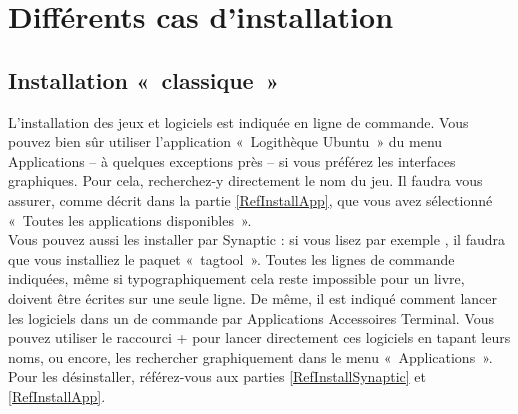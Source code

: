 \section{Différents cas d'installation}
\label{RefInstallJeuEtLogiciel}
\subsection{Installation «~classique~»}
L'installation des jeux et logiciels est indiquée en ligne de commande. Vous pouvez bien sûr utiliser l'application «~Logithèque Ubuntu~» du menu Applications -- à quelques exceptions près -- si vous préférez les interfaces graphiques. Pour cela, recherchez-y directement le nom du jeu. Il faudra vous assurer, comme décrit dans la partie \ref{RefInstallApp}, que vous avez sélectionné «~Toutes les applications disponibles~».\\
Vous pouvez aussi les installer par Synaptic : si vous lisez par exemple , il faudra que vous installiez le paquet «~tagtool~». Toutes les lignes de commande indiquées, même si typographiquement cela reste impossible pour un livre, doivent être écrites sur une seule ligne. De même, il est indiqué comment lancer les logiciels dans un  de commande par Applications \FlecheDroite Accessoires \FlecheDroite Terminal. Vous pouvez utiliser le raccourci  +  pour lancer directement ces logiciels en tapant leurs noms, ou encore, les rechercher graphiquement dans le menu «~Applications~».\\ Pour les désinstaller, référez-vous aux parties \ref{RefInstallSynaptic} et \ref{RefInstallApp}.
